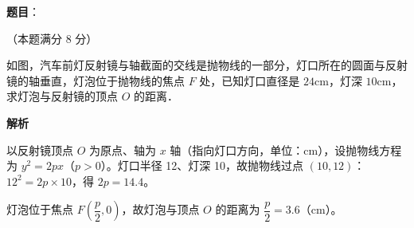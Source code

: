 \begin{answer}

\textbf{题目}：

（本题满分 8 分）

如图，汽车前灯反射镜与轴截面的交线是抛物线的一部分，灯口所在的圆面与反射镜的轴垂直，灯泡位于抛物线的焦点 \(F\) 处，已知灯口直径是 \(24\mathrm{cm}\)，灯深 \(10\mathrm{cm}\)，求灯泡与反射镜的顶点 \(O\) 的距离．
\nopagebreak[4]
\begin{center}\end{center}
\nopagebreak[4]
\textbf{解析}

以反射镜顶点 \(O\) 为原点、轴为 \(x\) 轴（指向灯口方向，单位：cm），设抛物线方程为 \(y^{2}=2px\)（\(p>0\)）。灯口半径 12、灯深 10，故抛物线过点 \((10,12)\)：\(12^{2}=2p\times 10\)，得 \(2p=14.4\)。

灯泡位于焦点 \(F\left(\dfrac{p}{2},0\right)\)，故灯泡与顶点 \(O\) 的距离为 \(\dfrac{p}{2}=3.6\)（\(\mathrm{cm}\)）。


\end{answer}
